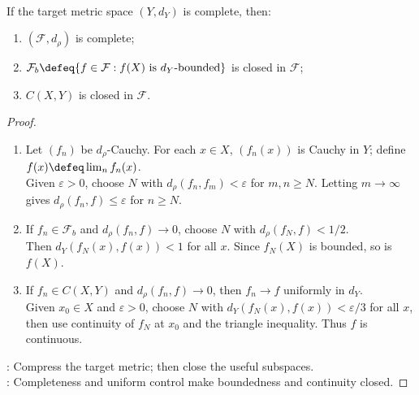 \begin{theorem} \label{thm:bounded-target-metric-function-space-completeness} \\
If the target metric space $(Y,d_Y)$ is complete, then:
\begin{enumerate}[label=(\roman*)]
\setlength{\itemsep}{0pt}
\item $(\mathcal{F},d_\rho)$ is complete;
\item $\mathcal{F}_b\defeq\{f\in\mathcal{F}:f(X)\text{ is }d_Y\text{-bounded}\}$ is closed in $\mathcal{F}$;
\item $C(X,Y)$ is closed in $\mathcal{F}$.
\end{enumerate}
\begin{proof}
\begin{enumerate}[label=(\roman*)]
\setlength{\itemsep}{0pt}
\item Let $(f_n)$ be $d_\rho$-Cauchy. For each $x\in X$, $(f_n(x))$ is Cauchy in $Y$; define $f(x)\defeq\lim_nf_n(x)$.\\
Given $\varepsilon>0$, choose $N$ with $d_\rho(f_n,f_m)<\varepsilon$ for $m,n\geq N$. Letting $m\to\infty$ gives $d_\rho(f_n,f)\leq\varepsilon$ for $n\geq N$.
\item If $f_n\in\mathcal{F}_b$ and $d_\rho(f_n,f)\to0$, choose $N$ with $d_\rho(f_N,f)<1/2$.\\
Then $d_Y(f_N(x),f(x))<1$ for all $x$. Since $f_N(X)$ is bounded, so is $f(X)$.
\item If $f_n\in C(X,Y)$ and $d_\rho(f_n,f)\to0$, then $f_n\to f$ uniformly in $d_Y$.\\
Given $x_0\in X$ and $\varepsilon>0$, choose $N$ with $d_Y(f_N(x),f(x))<\varepsilon/3$ for all $x$, then use continuity of $f_N$ at $x_0$ and the triangle inequality. Thus $f$ is continuous.
\end{enumerate}
: Compress the target metric; then close the useful subspaces.\\
: Completeness and uniform control make boundedness and continuity closed.
\end{proof}
\end{theorem}

